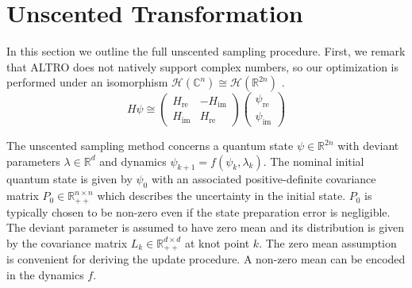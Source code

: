 \section{Unscented Transformation}
\label{appendix:unscented}
In this section we outline the full unscented sampling procedure.
First, we remark that ALTRO does not natively support complex numbers, so our optimization
is performed under an isomorphism 
$\mathcal{H}(\mathbb{C}^{n}) \cong \mathcal{H}(\mathbb{R}^{2n})$
\cite{leung2017speedup}. 
\begin{equation}
  H \psi \cong \begin{pmatrix} H_{\textrm{re}} & -H_{\textrm{im}} \\ H_{\textrm{im}} & H_{\textrm{re}}\end{pmatrix}
  \begin{pmatrix} \psi_{\textrm{re}} \\ \psi_{\textrm{im}}\end{pmatrix}
\end{equation}

The unscented sampling method concerns a quantum state $\psi \in \mathbb{R}^{2n}$ with
deviant parameters $\lambda \in \mathbb{R}^{d}$ and dynamics $\psi_{k + 1} = f(\psi_{k}, \lambda_{k})$.
The nominal initial quantum state is given by $\psi_{0}$ with an associated
positive-definite covariance matrix $P_{0} \in \mathbb{R}_{++}^{n \times n}$
which describes the uncertainty in the initial state.
$P_{0}$ is typically chosen to be non-zero even if the state preparation error is negligible.
The deviant parameter
is assumed to have zero mean and its distribution is given by the covariance matrix
$L_{k} \in \mathbb{R}_{++}^{d \times d}$ at knot point $k$. The zero mean assumption
is convenient for deriving the update procedure. A non-zero mean can be encoded
in the dynamics $f$.

